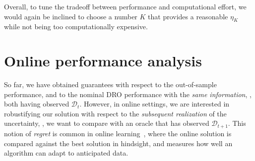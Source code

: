 Overall, to tune the tradeoff between performance and computational effort, we would again be inclined to choose a number $K$ that provides a reasonable $\eta_K$ while not being too computationally expensive. 


\section{Online performance analysis}
\label{sec:regret}
So far, we have obtained guarantees with respect to the out-of-sample performance, and to the nominal \gls{DRO} performance with the {\it same information}, \ie, both having observed $\mathcal{D}_{t}$. 
However, in online settings, we are interested in robustifying our solution with respect to the {\it subsequent realization} of the uncertainty, \ie, we want to compare with an oracle that has observed $\mathcal{D}_{t+1}$. 
This notion of {\it regret} is common in  online learning~\cite{drotime,regret, regret2}, where the online solution is compared against the best solution in hindsight, and measures how well an algorithm can adapt to anticipated data.

